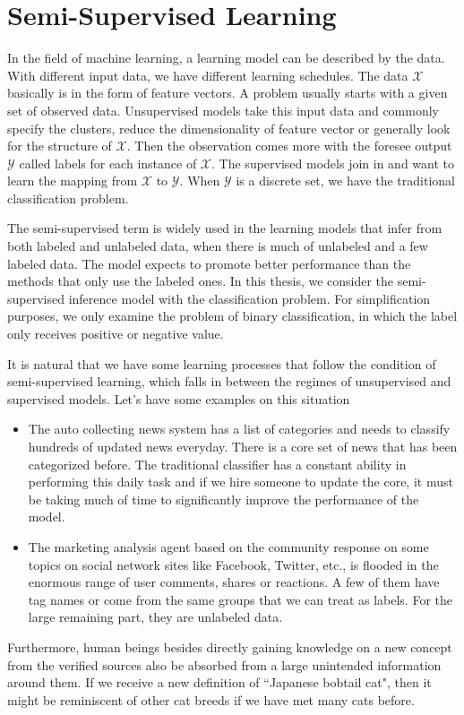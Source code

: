 \section{Semi-Supervised Learning}
In the field of machine learning, a learning model can be described by the data. With different input data, we have different learning schedules. The data  $\mathcal{X}$ basically is in the form of feature vectors. A problem usually starts with a given set of observed data. Unsupervised models take this input data and commonly specify the clusters, reduce the dimensionality of feature vector or generally look for the structure of $\mathcal{X}$. Then the observation comes more with the foresee output $\mathcal{Y}$ called labels for each instance of $\mathcal{X}$. The supervised models join in and want to learn the mapping from $\mathcal{X}$ to $\mathcal{Y}$. When $\mathcal{Y}$ is a discrete set, we have the traditional classification problem. 

The semi-supervised term is widely used in the learning models that infer from both labeled and unlabeled data, when there is much of unlabeled and a few labeled data. The model expects to promote better performance than the methods that only use the labeled ones. In this thesis, we consider the semi-supervised inference model with the classification problem. For simplification purposes, we only examine the problem of binary classification, in which the label only receives positive or negative value. 

It is natural that we have some learning processes that follow the condition of semi-supervised learning, which falls in between the regimes of unsupervised and supervised models. Let's have some examples on this situation
\begin{itemize}  
	\item The auto collecting news system has a list of categories and needs to classify hundreds of updated news everyday. There is a core set of news that has been categorized before. The traditional classifier has a constant ability in performing this daily task and if we hire someone to update the core, it must be taking much of time to significantly improve the performance of the model.
	
 	\item The marketing analysis agent based on the community response on some topics on social network sites like Facebook, Twitter, etc., is flooded in the enormous range of user comments, shares or reactions. A few of them have tag names or come from the same groups that we can treat as labels. For the large remaining part, they are unlabeled data.
\end{itemize}
Furthermore, human beings besides directly gaining knowledge on a new concept from the verified sources also be absorbed from a large unintended information around them. If we receive a new definition of ``Japanese bobtail cat", then it might be reminiscent of other cat breeds if we have met many cats before.

